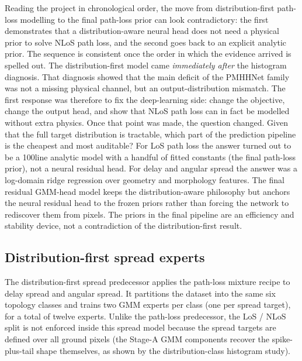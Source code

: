 Reading the project in chronological order, the move from distribution-first path-loss modelling to the final path-loss prior can
look contradictory: the first demonstrates that a distribution-aware neural
head does not need a physical prior to solve NLoS path loss, and the second
goes back to an explicit analytic prior. The sequence is consistent once the
order in which the evidence arrived is spelled out. The distribution-first model came
\emph{immediately after} the histogram diagnosis. That diagnosis
showed that the main deficit of the PMHHNet family was not a missing physical
channel, but an output-distribution mismatch. The first response was therefore
to fix the deep-learning side: change the objective, change the output head,
and show that NLoS path loss can in fact be modelled without extra physics.
Once that point was made, the question changed. Given that the full target
distribution is tractable, which part of the prediction pipeline is the
cheapest and most auditable? For LoS path loss the answer turned out to be a
\SI{100}{\mathrm{-}}line analytic model with a handful of fitted constants
(the final path-loss prior), not a neural residual head. For delay and angular spread the answer
was a log-domain ridge regression over geometry and morphology features.
The final residual GMM-head model keeps the distribution-aware philosophy but
anchors the neural residual head to the frozen priors rather than forcing
the network to rediscover them from pixels. The priors in the final pipeline
are an efficiency and stability device, not a contradiction of the distribution-first
result.

\subsection{Distribution-first spread experts}

The distribution-first spread predecessor applies the path-loss mixture recipe to delay spread and
angular spread. It partitions the dataset into the same six topology
classes and trains two GMM experts per class (one per spread target),
for a total of twelve experts. Unlike the path-loss predecessor, the LoS / NLoS split is
not enforced inside this spread model because the spread targets are defined over
all ground pixels (the Stage-A GMM components recover the
spike-plus-tail shape themselves, as shown by the distribution-class
histogram study).

